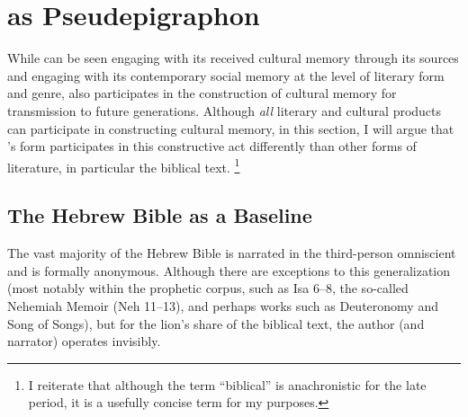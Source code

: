 \section{\ga as Pseudepigraphon}

While \ga can be seen engaging with its received cultural memory through its sources and engaging with its contemporary social memory at the level of literary form and genre, \ga also participates in the construction of cultural memory for transmission to future generations. Although \emph{all} literary and cultural products can participate in constructing cultural memory, in this section, I will argue that \ga's \psgraphic form participates in this constructive act differently than other forms of literature, in particular the biblical text.%
    \footnote{I reiterate that although the term ``biblical'' is anachronistic for the late \secondtemple period, it is a usefully concise term for my purposes.}

\subsection{The Hebrew Bible as a Baseline}

The vast majority of the Hebrew Bible is narrated in the third-person omniscient and is formally anonymous. Although there are exceptions to this generalization (most notably within the prophetic corpus, such as Isa 6--8, the so-called Nehemiah Memoir (Neh 11--13), and perhaps works such as Deuteronomy and Song of Songs), but for the lion's share of the biblical text, the author (and narrator) operates invisibly.

